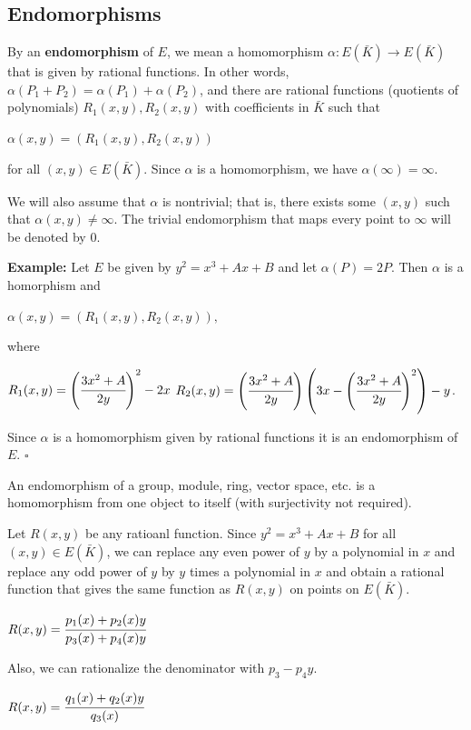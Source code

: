 \documentclass[a4paper, 12pt]{article}
\begin{document}
\subsection{Endomorphisms}
By an \textbf{endomorphism} of $E$, we mean a homomorphism $\alpha:E(\bar{K})\rightarrow E(\bar{K})$ that is given by rational functions. In other words, $\alpha(P_1+P_2)=\alpha(P_1)+\alpha(P_2)$, and there are rational functions (quotients of polynomials) $R_1(x,y),R_2(x,y)$ with coefficients in $\bar{K}$ such that
\begin{center} $\alpha(x,y)=(R_1(x,y),R_2(x,y))$ \end{center}
for all $(x,y) \in E(\bar{K})$. Since $\alpha$ is a homomorphism, we have $\alpha(\infty) = \infty$. \par We will also assume that $\alpha$ is nontrivial; that is, there exists some $(x,y)$ such that $\alpha(x,y) \neq \infty$. The trivial endomorphism that maps every point to $\infty$ will be denoted by $0$.\par
\textbf{Example:}\newline
\quad Let $E$ be given by $y^2=x^3+Ax+B$ and let $\alpha(P)=2P$. Then $\alpha$ is a homorphism and
\begin{center} $\alpha(x,y)=(R_1(x,y),R_2(x,y)),$ \end{center}
where 
\begin{center}
$R_1(x,y) = \left(\cfrac{3x^2+A}{2y}\right)^2 - 2x$\newline
$R_2(x,y) = \left(\cfrac{3x^2+A}{2y}\right)\left(3x - \left(\cfrac{3x^2+A}{2y}\right)^2\right) - y$.
\end{center}
Since $\alpha$ is a homomorphism given by rational functions it is an endomorphism of $E$. $\square$\par
An endomorphism of a group, module, ring, vector space, etc. is a homomorphism from one object to itself (with surjectivity not required).\par
Let $R(x,y)$ be any ratioanl function. Since $y^2=x^3+Ax+B$ for all $(x,y) \in E(\bar{K})$, we can replace any even power of $y$ by a polynomial in $x$ and replace any odd power of $y$ by $y$ times a polynomial in $x$ and obtain a rational function that gives the same function as $R(x,y)$ on points on $E(\bar{K})$. 
\begin{center} $R(x,y) = \cfrac{p_1(x)+p_2(x)y}{p_3(x)+p_4(x)y}$\end{center}
Also, we can rationalize the denominator with $p_3-p_4y$.
\begin{center} $R(x,y) = \cfrac{q_1(x)+q_2(x)y}{q_3(x)}$\end{center}
\end{document}
